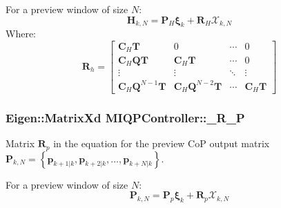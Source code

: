 \-For a preview window of size $N$\-: \[ \mathbf{H}_{k,N} = \mathbf{P}_H \mathbf{\xi}_k + \mathbf{R}_H \mathcal{X}_{k,N} \] \-Where\-: \[ \mathbf{R}_h = \left[\begin{array}{cccc} \mathbf{C}_H\mathbf{T} & 0 & \cdots & 0 \\ \mathbf{C}_H\mathbf{Q}\mathbf{T} & \mathbf{C}_H\mathbf{T} & \cdots & 0 \\ \vdots & \vdots & \ddots & \vdots \\ \mathbf{C}_H\mathbf{Q}^{N-1}\mathbf{T} & \mathbf{C}_H\mathbf{Q}^{N-2}\mathbf{T} & \cdots & \mathbf{C}_H\mathbf{T} \end{array}\right] \] \hypertarget{classMIQPController_a7cede44e7827c9b4b12f2549714f3adf}{
\subsubsection[{\-\_\-\-R\-\_\-\-P}]{\setlength{\rightskip}{0pt plus 5cm}\-Eigen\-::\-Matrix\-Xd {\bf \-M\-I\-Q\-P\-Controller\-::\-\_\-\-R\-\_\-\-P}}}\label{classMIQPController_a7cede44e7827c9b4b12f2549714f3adf}
\-Matrix $\mathbf{R}_p$ in the equation for the preview \-Co\-P output matrix $\mathbf{P}_{k,N} = \left\{ \mathbf{p}_{k+1|k}, \mathbf{p}_{k+2|k}, \dots, \mathbf{p}_{k+N|k} \right\}$.

\-For a preview window of size $N$\-: \[ \mathbf{P}_{k,N} = \mathbf{P}_p \mathbf{\xi}_k + \mathbf{R}_p \mathcal{X}_{k,N} \]


